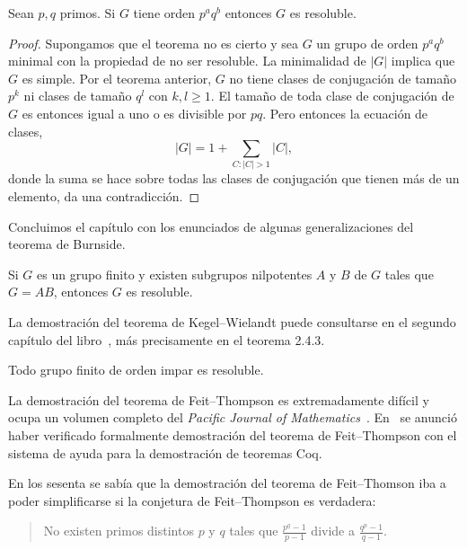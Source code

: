 \begin{theorem}[Burnside]
  Sean $p,q$ primos. Si $G$ tiene orden $p^aq^b$ entonces $G$ es resoluble.
\end{theorem}

\begin{proof}
	Supongamos que el teorema no es cierto y sea $G$ un grupo de orden $p^aq^b$
	minimal con la propiedad de no ser resoluble. La minimalidad de $|G|$
	implica que $G$ es simple. Por el teorema anterior, $G$ no tiene clases de
	conjugación de tamaño $p^k$ ni clases de tamaño $q^l$ con $k,l\geq1$. El
	tamaño de toda clase de conjugación de $G$ es entonces igual a uno o es
	divisible por $pq$. Pero entonces la ecuación de clases, 
	\[
		|G|=1+\sum_{C:|C|>1}|C|,
	\]
	donde la suma se hace sobre todas las clases de conjugación que tienen más
	de un elemento, da una contradicción.
\end{proof}

Concluimos el capítulo con los enunciados de algunas 
generalizaciones del teorema de Burnside. 

\begin{theorem}
Si $G$ es un grupo finito y existen subgrupos nilpotentes $A$ y $B$ de $G$ tales
que $G=AB$, entonces $G$ es resoluble. 
\end{theorem}

La demostración del teorema de Kegel--Wielandt puede consultarse en el segundo 
capítulo del libro~\cite{MR1211633}, más precisamente en el teorema 2.4.3. 

\begin{theorem}
Todo grupo finito de orden impar es resoluble. 
\end{theorem}

La demostración del teorema de Feit--Thompson es extremadamente difícil y ocupa un volumen completo del 
\emph{Pacific Journal of Mathematics}~\cite{MR166261}. 
En~\cite{MR3111271} se anunció haber verificado formalmente 
demostración del teorema de Feit--Thompson con el 
sistema de ayuda para la demostración de teoremas Coq. 

\medskip
{}
En los sesenta se sabía que la demostración del teorema de Feit--Thomson iba a poder simplificarse 
si la conjetura de Feit--Thompson es verdadera:

\begin{quote}
No existen primos distintos $p$ y $q$ tales que
$\frac {p^{q}-1}{p-1}$ divide a $\frac{q^{p} - 1}{q - 1}$. 
\end{quote}

